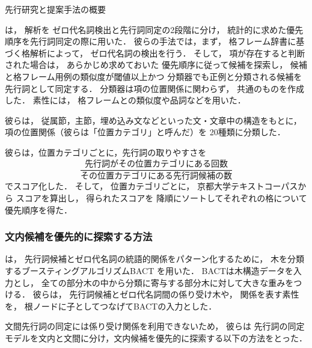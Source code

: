\documentclass[japanese]{jnlp_1.4}
\newcommand{\newcite}[1]{}
\begin{document}
\begin{savenotes}
\begin{table}[b]
\caption{先行研究と提案手法の概要}
\label{tbl:rwork}

\end{table}
\end{savenotes}

\newcite{Kawahara:2004:JNLP}は，
解析を
ゼロ代名詞検出と先行詞同定の2段階に分け，
統計的に求めた優先順序を先行詞同定の際に用いた．
彼らの手法では，まず，
格フレーム辞書に基づく格解析によって，
ゼロ代名詞の検出を行う．
そして，
項が存在すると判断された場合は，
あらかじめ求めておいた
優先順序に従って候補を探索し，
候補と格フレーム用例の類似度が閾値以上かつ
分類器でも正例と分類される候補を先行詞として同定する．
分類器は項の位置関係に関わらず，
共通のものを作成した．
素性には，
格フレームとの類似度や品詞などを用いた．


彼らは，
従属節，主節，埋め込み文などといった文・文章中の構造をもとに，
項の位置関係（彼らは「位置カテゴリ」と呼んだ）を
20種類に分類した．

彼らは，位置カテゴリごとに，先行詞の取りやすさを
\begin{equation}
\frac{先行詞がその位置カテゴリにある回数}{その位置カテゴリにある先行詞候補の数}	
\label{a}
\end{equation}
でスコア化した．
そして，
位置カテゴリごとに，
京都大学テキストコーパス\cite{Kawahara:2002:LREC}から
スコアを算出し，
得られたスコアを
降順にソートしてそれぞれの格について
優先順序を得た．


\subsubsection{文内候補を優先的に探索する方法}
\label{iida-bact}

\newcite{Iida:2007:TALIP}は，
先行詞候補とゼロ代名詞の統語的関係をパターン化するために，
木を分類するブースティングアルゴリズムBACT \cite{Kudo:2004:IPSJ}を用いた．
BACTは木構造データを入力とし，
全ての部分木の中から分類に寄与する部分木に対して大きな重みをつける．
彼らは，
先行詞候補とゼロ代名詞間の係り受け木や，
関係を表す素性を，
根ノードに子としてつなげてBACTの入力とした．



文間先行詞の同定には係り受け関係を利用できないため，
彼らは
先行詞の同定モデルを文内と文間に分け，文内候補を優先的に探索する以下の方法をとった．
\end{document}
